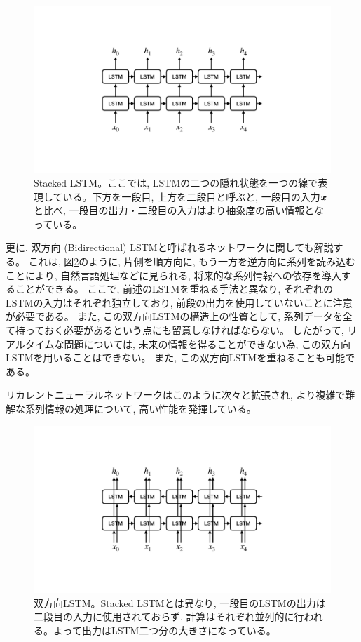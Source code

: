 \begin{figure}[htbp]
 \centering
 \includegraphics[trim = 0 200 0 200, width=1.0\textwidth, clip]{Figure/2DeepLearning/16StackedLSTM.png}
 \caption[Stacked LSTM]{Stacked LSTM。ここでは, LSTMの二つの隠れ状態を一つの線で表現している。下方を一段目, 上方を二段目と呼ぶと, 一段目の入力${\mbox{\boldmath{$x$}}}$と比べ, 一段目の出力・二段目の入力はより抽象度の高い情報となっている。}
 \label{16StackedLSTM}
\end{figure}
\newpage
更に, 双方向 (Bidirectional) LSTMと呼ばれるネットワークに関しても解説する。
これは, 図\ref{17BidirectionalLSTM}のように, 片側を順方向に, もう一方を逆方向に系列を読み込むことにより, 自然言語処理などに見られる, 将来的な系列情報への依存を導入することができる。
ここで, 前述のLSTMを重ねる手法と異なり, それぞれのLSTMの入力はそれぞれ独立しており, 前段の出力を使用していないことに注意が必要である。
また, この双方向LSTMの構造上の性質として, 系列データを全て持っておく必要があるという点にも留意しなければならない。
したがって, リアルタイムな問題については, 未来の情報を得ることができない為, この双方向LSTMを用いることはできない。
また, この双方向LSTMを重ねることも可能である。

リカレントニューラルネットワークはこのように次々と拡張され, より複雑で難解な系列情報の処理について, 高い性能を発揮している。

\begin{figure}[htbp]
 \centering
 \includegraphics[trim = 0 200 0 200, width=1.0\textwidth, clip]{Figure/2DeepLearning/17BidirectionalLSTM.png}
 \caption[双方向LSTM]{双方向LSTM。Stacked LSTMとは異なり, 一段目のLSTMの出力は二段目の入力に使用されておらず, 計算はそれぞれ並列的に行われる。よって出力はLSTM二つ分の大きさになっている。}
 \label{17BidirectionalLSTM}
\end{figure}

